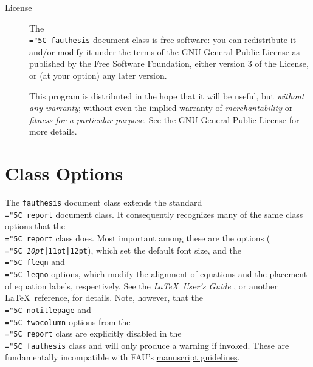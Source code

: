 \documentclass[11pt]{article}
\newcommand\guide{{http://www.fau.edu/graduate/forms-and-procedures/degree-completion/thesis-and-dissertation/index.php}}
\newcommand\code[1]{{\normalfont\texttt{\let\dv\textsl\chardef\\="5C #1}}}
\begin{document}
\begin{description}
\item[License]
The \code{fauthesis} document class is free software: you can redistribute it and/or modify it under the terms of the GNU General Public License as published by the Free Software Foundation, either version 3 of the License, or (at your option) any later version.

This program is distributed in the hope that it will be useful, but \textit{without any warranty}; without even the implied warranty of \textit{merchantability} or \textit{fitness for a particular purpose}.  See the \href{http://www.gnu.org/licenses/gpl.html}{GNU General Public License} for more details.
\end{description}



\section{Class Options}\label{options}

The \texttt{fauthesis} document class extends the standard \LaTeXe\ \code{report} document class.  It consequently recognizes many of the same class options that the \code{report} class does.  Most important among these are the options (\code{\dv{10pt}|11pt|12pt}), which set the default font size, and the \code{fleqn} and \code{leqno} options, which modify the alignment of equations and the placement of equation labels, respectively.  See the \textit{\LaTeX\ User's Guide} \cite{L:latex}, or another \LaTeX\ reference, for details.  Note, however, that the \code{notitlepage} and \code{twocolumn} options from the \code{report} class are explicitly disabled in the \code{fauthesis} class and will only produce a warning if invoked.  These are fundamentally incompatible with FAU's 
\href\guide{manuscript guidelines}.
\end{document}

